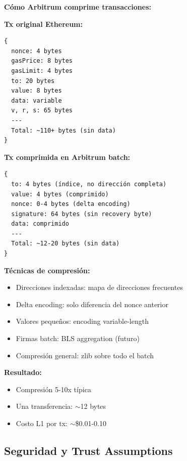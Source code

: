 \documentclass[11pt,a4paper,twoside,openright]{book}
\theoremstyle{definition}
\theoremstyle{plain}
\theoremstyle{remark}
\begin{document}
\begin{mathnote}
\textbf{Cómo Arbitrum comprime transacciones:}

\textbf{Tx original Ethereum:}
\begin{verbatim}
{
  nonce: 4 bytes
  gasPrice: 8 bytes  
  gasLimit: 4 bytes
  to: 20 bytes
  value: 8 bytes
  data: variable
  v, r, s: 65 bytes
  ---
  Total: ~110+ bytes (sin data)
}
\end{verbatim}

\textbf{Tx comprimida en Arbitrum batch:}
\begin{verbatim}
{
  to: 4 bytes (índice, no dirección completa)
  value: 4 bytes (comprimido)
  nonce: 0-4 bytes (delta encoding)
  signature: 64 bytes (sin recovery byte)
  data: comprimido
  ---
  Total: ~12-20 bytes (sin data)
}
\end{verbatim}

\textbf{Técnicas de compresión:}
\begin{itemize}
    \item Direcciones indexadas: mapa de direcciones frecuentes
    \item Delta encoding: solo diferencia del nonce anterior
    \item Valores pequeños: encoding variable-length
    \item Firmas batch: BLS aggregation (futuro)
    \item Compresión general: zlib sobre todo el batch
\end{itemize}

\textbf{Resultado:}
\begin{itemize}
    \item Compresión 5-10x típica
    \item Una transferencia: $\sim$12 bytes
    \item Costo L1 por tx: $\sim$\$0.01-0.10
\end{itemize}
\end{mathnote}

\subsection{Seguridad y Trust Assumptions}
\end{document}
